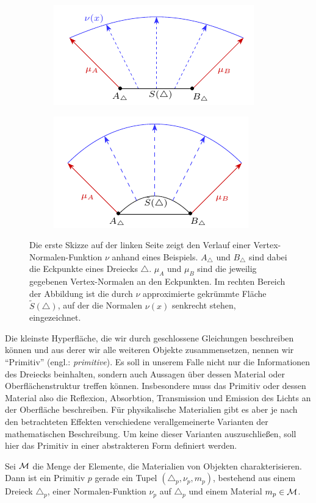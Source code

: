 		\begin{figure}
			\begin{subfigure}[b]{0.5\textwidth}
				\center
				\includegraphics{gg_fig/scheme_normal-function_1.pdf}
			\end{subfigure}
			\begin{subfigure}[b]{0.5\textwidth}
				\center
				\includegraphics{gg_fig/scheme_normal-function_2.pdf}
			\end{subfigure}
			\caption{Die erste Skizze auf der linken Seite zeigt den Verlauf einer Vertex-Normalen-Funktion $\nu$ anhand eines Beispiels. $A_\triangle$ und $B_\triangle$ sind dabei die Eckpunkte eines Dreiecks $\triangle$. $\mu_A$ und $\mu_B$ sind die jeweilig gegebenen Vertex-Normalen an den Eckpunkten. Im rechten Bereich der Abbildung ist die durch $\nu$ approximierte gekrümmte Fläche $\tilde{S}(\triangle)$, auf der die Normalen $\nu(x)$ senkrecht stehen, eingezeichnet.}
			\label{fig:normal-function}
		\end{figure}

		Die kleinste Hyperfläche, die wir durch geschlossene Gleichungen beschreiben können und aus derer wir alle weiteren Objekte zusammensetzen, nennen wir \enquote{Primitiv} (engl.: \textit{primitive}).
		Es soll in unserem Falle nicht nur die Informationen des Dreiecks beinhalten, sondern auch Aussagen über dessen Material oder Oberflächenstruktur treffen können.
		Insbesondere muss das Primitiv oder dessen Material also die Reflexion, Absorbtion, Transmission und Emission des Lichts an der Oberfläche beschreiben.
		Für physikalische Materialien gibt es aber je nach den betrachteten Effekten verschiedene verallgemeinerte Varianten der mathematischen Beschreibung.
		Um keine dieser Varianten auszuschließen, soll hier das Primitiv in einer abstrakteren Form definiert werden.
		\begin{definition}[Primitiv]
			Sei $\mathcal{M}$ die Menge der Elemente, die Materialien von Objekten charakterisieren.
			Dann ist ein Primitiv $p$ gerade ein Tupel $(\triangle_p, \nu_p, m_p)$, bestehend aus einem Dreieck $\triangle_p$, einer Normalen-Funktion $\nu_p$ auf $\triangle_p$ und einem Material $m_p\in \mathcal{M}$.
		\end{definition}


